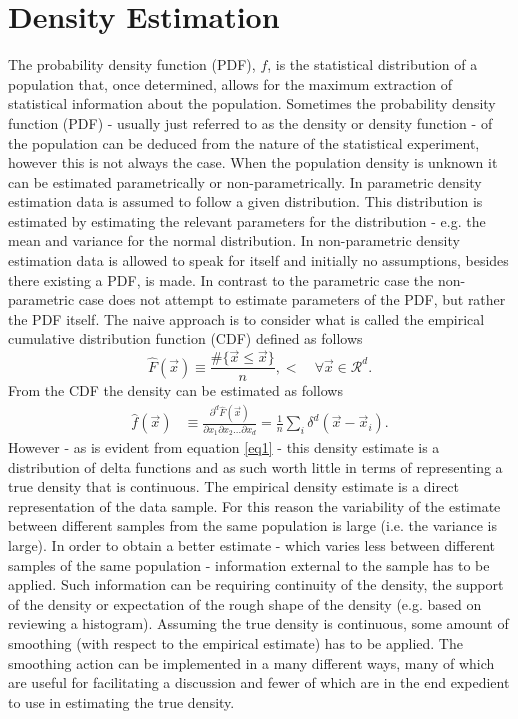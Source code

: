 \chapter{Density Estimation}
\label{chp:dens}
The probability density function (PDF), $f$, is the statistical distribution of a population that, once determined, allows for the maximum extraction of statistical information about the population. Sometimes the probability density function (PDF) - usually just referred to as the density or density function - of the population can be deduced from the nature of the statistical experiment, however this is not always the case. When the population density is unknown it can be estimated parametrically or non-parametrically. In parametric density estimation data is assumed to follow a given distribution. This distribution is estimated by estimating the relevant parameters for the distribution - e.g. the mean and variance for the normal distribution. In non-parametric density estimation data is allowed to speak for itself and initially no assumptions, besides there existing a PDF, is made. In contrast to the parametric case the non-parametric case does not attempt to estimate parameters of the PDF, but rather the PDF itself. The naive approach is to consider what is called the empirical cumulative distribution function (CDF) defined as follows\citep{scott}
\begin{equation}
	\hat{F}(\vec{x})\equiv \frac{\#\{\vec{x}\leq \vec{x}\}}{n},<\quad\forall \vec{x}\in \mathcal{R}^d.
	\label{eeq1}
\end{equation}
From the CDF the density can be estimated as follows
\begin{equation}
	\begin{split}
		\hat{f}(\vec{x})&\equiv \frac{\partial ^d\hat{F}(\vec{x})}{\partial x_1\partial x_2\dots \partial x_d}=\frac{1}{n}\sum_{i}\delta^d(\vec{x}-\vec{x}_i).
	\end{split}
	\label{eq1}
\end{equation}
However - as is evident from equation \eqref{eq1} - this density estimate is a distribution of delta functions and as such worth little in terms of representing a true density that is continuous. The empirical density estimate is a direct representation of the data sample. For this reason the variability of the estimate between different samples from the same population is large (i.e. the variance is large). In order to obtain a better estimate - which varies less between different samples of the same population - information external to the sample has to be applied. Such information can be requiring continuity of the density, the support of the density or expectation of the rough shape of the density (e.g. based on reviewing a histogram). Assuming the true density is continuous, some amount of smoothing (with respect to the empirical estimate) has to be applied. The smoothing action can be implemented in a many different ways, many of which are useful for facilitating a discussion and fewer of which are in the end expedient to use in estimating the true density. 
